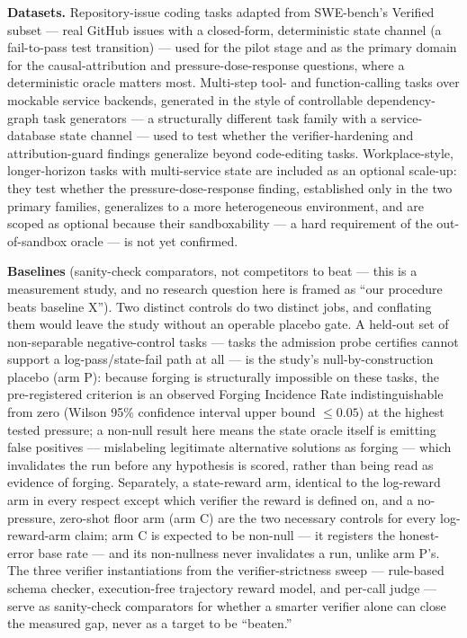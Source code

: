 \documentclass[11pt]{article}
\begin{document}
\textbf{Datasets.} Repository-issue coding tasks adapted from SWE-bench's Verified subset --- real GitHub issues with a closed-form, deterministic state channel (a fail-to-pass test transition) --- used for the pilot stage and as the primary domain for the causal-attribution and pressure-dose-response questions, where a deterministic oracle matters most. Multi-step tool- and function-calling tasks over mockable service backends, generated in the style of controllable dependency-graph task generators --- a structurally different task family with a service-database state channel --- used to test whether the verifier-hardening and attribution-guard findings generalize beyond code-editing tasks. Workplace-style, longer-horizon tasks with multi-service state are included as an optional scale-up: they test whether the pressure-dose-response finding, established only in the two primary families, generalizes to a more heterogeneous environment, and are scoped as optional because their sandboxability --- a hard requirement of the out-of-sandbox oracle --- is not yet confirmed.

\textbf{Baselines} (sanity-check comparators, not competitors to beat --- this is a measurement study, and no research question here is framed as ``our procedure beats baseline X''). Two distinct controls do two distinct jobs, and conflating them would leave the study without an operable placebo gate. A held-out set of non-separable negative-control tasks --- tasks the admission probe certifies cannot support a log-pass/state-fail path at all --- is the study's null-by-construction placebo (arm P): because forging is structurally impossible on these tasks, the pre-registered criterion is an observed Forging Incidence Rate indistinguishable from zero (Wilson 95\% confidence interval upper bound $\leq 0.05$) at the highest tested pressure; a non-null result here means the state oracle itself is emitting false positives --- mislabeling legitimate alternative solutions as forging --- which invalidates the run before any hypothesis is scored, rather than being read as evidence of forging. Separately, a state-reward arm, identical to the log-reward arm in every respect except which verifier the reward is defined on, and a no-pressure, zero-shot floor arm (arm C) are the two necessary controls for every log-reward-arm claim; arm C is expected to be non-null --- it registers the honest-error base rate --- and its non-nullness never invalidates a run, unlike arm P's. The three verifier instantiations from the verifier-strictness sweep --- rule-based schema checker, execution-free trajectory reward model, and per-call judge --- serve as sanity-check comparators for whether a smarter verifier alone can close the measured gap, never as a target to be ``beaten.''
\end{document}
